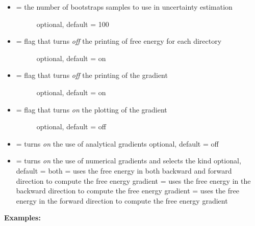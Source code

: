 \documentclass[letterpaper,10pt,english]{sphinxmanual}
\begin{document}
\begin{itemize}
\begin{description}
\end{description}

\item {} \begin{description}
\item[{ = the number of bootstraps samples to use in uncertainty estimation}] \leavevmode
optional, default = 100

\end{description}

\item {} \begin{description}
\item[{  = flag that turns \emph{off} the printing of free energy for each directory}] \leavevmode
optional, default = on

\end{description}

\item {} \begin{description}
\item[{  = flag that turns \emph{off} the printing of the gradient}] \leavevmode
optional, default = on

\end{description}

\item {} \begin{description}
\item[{  = flag that turns \emph{on} the plotting of the gradient}] \leavevmode
optional, default = off

\end{description}

\item {} 
 = turns \emph{on} the use of analytical gradients
optional, default = off

\item {} 
 = turns \emph{on} the use of numerical gradients and selects the kind
optional, default = both
 = uses the free energy in both backward and forward direction to compute the free energy gradient
 = uses the free energy in the backward direction to compute the free energy gradient
 = uses the free energy in the forward direction to compute the free energy gradient

\end{itemize}

\textbf{Examples:}
\end{document}
